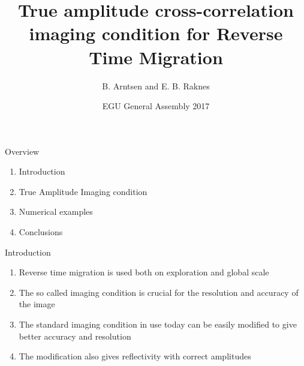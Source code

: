\documentclass[xcolor=dvipsnames]{beamer}
\begin{document}
\title{True amplitude cross-correlation imaging condition for Reverse Time Migration}
\author{B. Arntsen and E. B. Raknes}
\date{EGU General Assembly 2017}
\begin{frame}
 \titlepage
\end{frame}
\begin{frame}{Overview}
\begin{enumerate}
  \item Introduction
  \item True Amplitude Imaging condition
  \item Numerical examples
  \item Conclusions
\end{enumerate}
\end{frame}
\begin{frame}{Introduction}
\begin{enumerate}
   \item Reverse time migration is used both on
         exploration and global scale
   \item The so called imaging condition is crucial for
         the resolution and accuracy of the image
   \item The standard imaging condition in use today can
         be easily modified to give better accuracy and
         resolution 
   \item The modification also gives reflectivity with
         correct amplitudes
\end{enumerate}
\end{frame}
\end{document}
